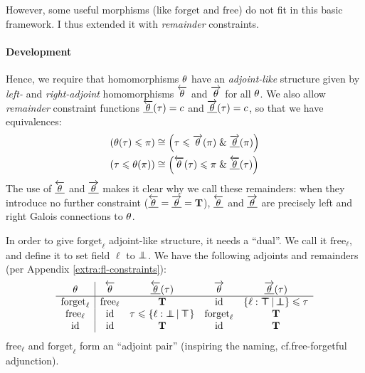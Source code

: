 However, some useful morphisms (like $\mathrm{forget}$ and $\mathrm{free}$) do not fit in this basic framework. I thus extended it with \emph{remainder} constraints.

\paragraph{Development}
Hence, we require that homomorphisms $\theta$ have an \emph{adjoint-like} structure given by \emph{left-} and \emph{right-adjoint} homomorphisms $\overleftarrow{\theta}$ and $\overrightarrow{\theta}$ for all $\theta$. We also allow \emph{remainder} constraint functions $\underline{\overleftarrow{\theta}}(\tau) = c$ and $\underline{\overrightarrow{\theta}}(\tau) = c$, so that we have equivalences:
\begin{align*}
(\morph(\tau) \sub \pi) &\cstreq \left(\tau \sub \radj \morph(\pi) \und \radjrest \morph(\pi) \right) \\
(\tau \sub \morph(\pi)) &\cstreq \left(\ladj \morph(\tau) \sub \pi \und \ladjrest \morph(\tau) \right)
\end{align*}
The use of $\underline{\overleftarrow{\theta}}$ and $\underline{\overrightarrow{\theta}}$ makes it clear why we call these remainders: when they introduce no further constraint ($\underline{\overleftarrow{\theta}} = \underline{\overrightarrow{\theta}} = \mathbf T$), $\underline{\overleftarrow{\theta}}$ and $\underline{\overrightarrow{\theta}}$ are precisely left and right Galois connections to $\theta$.

\begin{example}
    In order to give $\mathrm{forget}_\ell$  adjoint-like structure, it needs a \enquote{dual}. We call it $\mathrm{free}_\ell$, and define it to set field $\ell$ to $\bot \!\!\!\! \bot$. We have the following adjoints and remainders (per Appendix \ref{extra:fl-constraints}):
    $$\begin{array}{c|cccc}
    \morph & \ladj \morph & \ladjrest \morph(\tau) & \radj \morph & \radjrest \morph(\tau) \\ \hline 
    \mathrm{forget}_\ell & \mathrm{free}_\ell & \tru & \mathrm{id} & \flext{\ell : \flftop}{\flfbot} \sub \tau \\
    \mathrm{free}_\ell & \mathrm{id} & \tau \sub \flext{\ell : \flfbot}{\flftop} & \mathrm{forget}_\ell & \tru \\ 
    \mathrm{id} & \mathrm{id} & \tru & \mathrm{id} & \tru 
    \end{array}$$    
    $\mathrm{free}_\ell$ and $\mathrm{forget}_\ell$ form an \enquote{adjoint pair} (inspiring the naming, cf.\@ free-forgetful adjunction).
\end{example}

